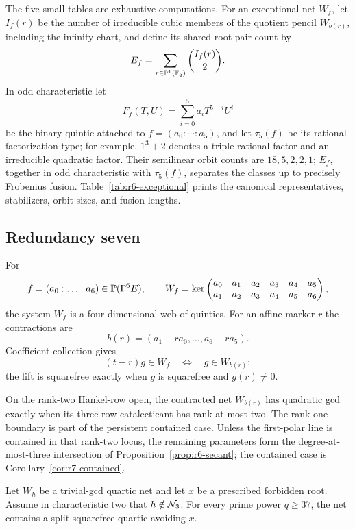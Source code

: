 The five small tables are exhaustive computations.  For an exceptional
net \(W_f\), let \(I_f(r)\) be the number of irreducible cubic members
of the quotient pencil \(W_{b(r)}\), including the infinity chart, and
define its shared-root pair count by
\[
                 E_f=\sum_{r\in\mathbb P^1(\mathbb F_q)}\binom{I_f(r)}2.
\]
In odd characteristic let
\[
                 F_f(T,U)=\sum_{i=0}^5a_iT^{5-i}U^i
\]
be the binary quintic attached to \(f=(a_0:\cdots:a_5)\), and let
\(\tau_5(f)\) be its rational factorization type; for example,
\(1^3+2\) denotes a triple rational factor and an irreducible
quadratic factor.  Their semilinear orbit counts are
\(18,5,2,2,1\); \(E_f\), together in odd characteristic with
\(\tau_5(f)\), separates the classes up to precisely Frobenius fusion.
Table~\ref{tab:r6-exceptional} prints
the canonical representatives, stabilizers, orbit sizes, and fusion
lengths.



\subsection{Redundancy seven}

For
\[
f=(a_0:\ldots:a_6)\in\mathbb P(\Gamma^6E),\qquad
W_f=\ker
\begin{pmatrix}
a_0&a_1&a_2&a_3&a_4&a_5\\
a_1&a_2&a_3&a_4&a_5&a_6
\end{pmatrix},
\]
the system $W_f$ is a four-dimensional web of quintics.  For an affine
marker $r$ the contractions are
\[
 b(r)=(a_1-ra_0,\ldots,a_6-ra_5).
\]
Coefficient collection gives
\[
(t-r)g\in W_f\quad\Longleftrightarrow\quad g\in W_{b(r)};
\]
the lift is squarefree exactly when \(g\) is squarefree and \(g(r)\ne0\).

On the rank-two Hankel-row open, the contracted net \(W_{b(r)}\) has quadratic
gcd exactly when its three-row catalecticant has rank at most two.  The
rank-one boundary is part of the persistent contained case.  Unless the
first-polar line is contained in that rank-two locus, the remaining parameters
form the degree-at-most-three intersection of
Proposition~\ref{prop:r6-secant}; the contained case is
Corollary~\ref{cor:r7-contained}.

\begin{proposition}
\label{prop:r7-pointed}%
%
%
Let \(W_h\) be a trivial-gcd quartic net and let \(x\) be a prescribed
forbidden root.  Assume in characteristic two that \(h\notin\mathcal N_3\).
For every prime power \(q\geq37\), the net contains a split squarefree
quartic avoiding \(x\).
\end{proposition}

